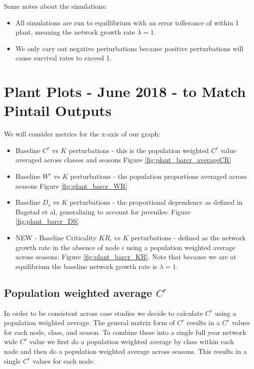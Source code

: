 \documentclass[10pt]{article}
\begin{document}
Some notes about the simulations:
\begin{itemize}
\item All simulations are run to equillibrium with an error tollerance of within 1 plant, meaning the network growth rate $\lambda=1$.
\item We only cary out negative perturbations because positive perturbations will cause survival rates to exceed 1.
\end{itemize}
%  


\newpage 



\section{Plant Plots - June 2018 - to Match Pintail Outputs}

We will consider metrics for the x-axis of our graph:
\begin{itemize}
\item Baseline $C^r$ vs $K$ perturbations - this is the population weighted $C^r$ value averaged across classes and seasons Figure \ref{fig:plant_barcr_averageCR}
\item Baseline $W^r$ vs $K$ perturbations - the population proportions averaged across seasons Figure \ref{fig:plant_barcr_WR}
\item Baseline $D_s$ vs $K$ perturbations - the proportional dependence as defined in Bagstad et al, generalizing to account for juveniles: Figure \ref{fig:plant_barcr_DS}
\item NEW - Baseline Criticality $KR_i$ vs $K$ perturbations - defined as the network growth rate in the absence of node $i$ using a population weighted average across seasons: Figure \ref{fig:plant_barcr_KR}. Note that because we are at equilibrium the baseline network growth rate is $\lambda = 1$.
\end{itemize}

\newpage
\subsection{Population weighted average \texorpdfstring{$C^r$}{CR}}

In order to be consistent across case studies we decide to calculate $C^r$ using a population weighted average. The general matrix form of $C^r$ results in a $C^r$ values for each node, class, and season. To combine these into a single full year network wide $C^r$ value we first do a population weighted average by class within each node and then do a population weighted average across seasons. This results in a single $C^r$ values for each node.
\end{document}
